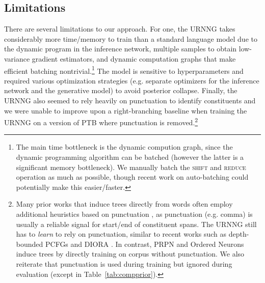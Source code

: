 \documentclass[11pt,a4paper]{article}
\begin{document}
\subsection{Limitations}
\vspace{-1.5mm}
There are several limitations to our approach. For one, the URNNG takes considerably more time/memory to train than a standard language model due to the  dynamic program in the inference network, multiple samples to obtain
low-variance gradient estimators, and dynamic computation graphs that make efficient batching nontrivial.\footnote{The main time bottleneck is the dynamic compution graph, since the dynamic programming algorithm can be batched (however the latter is a significant memory bottleneck). We manually batch the \textsc{shift} and \textsc{reduce} operation as much as possible, though recent work on auto-batching \cite{neubig2017batching} could potentially make this  easier/faster.}
The model is sensitive to hyperparameters and required
various optimization strategies (e.g. separate optimizers for the inference network and the generative model) to avoid posterior collapse.
Finally, the URNNG also seemed to rely heavily on punctuation to identify constituents and we were unable to improve upon a right-branching baseline when training the URNNG on a version of PTB where punctuation is removed.\footnote{Many prior works that induce trees directly from words often employ additional heuristics based on punctuation \cite{seginer2007unsup,ponvert2011simple,spitkovsky2013breaking,parikh2014spectral}, as punctuation (e.g. comma) is usually a reliable signal for start/end of constituent spans. The URNNG still has to \emph{learn} to rely on punctuation, similar to recent works such as depth-bounded PCFGs \cite{jin2018depth} and DIORA \cite{drozdov2018latent}. In contrast, PRPN \cite{shen2018nlm} and Ordered Neurons \cite{shen2019ordered} induce trees by directly training on corpus without punctuation. We also reiterate that punctuation is used during training but ignored during evaluation (except in Table~\ref{tab:compprior}).} 
\end{document}
